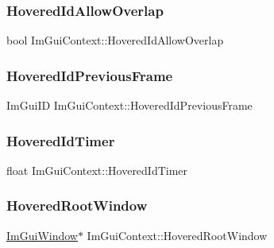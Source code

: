 \subsubsection{\texorpdfstring{Hovered\+Id\+Allow\+Overlap}{HoveredIdAllowOverlap}}
{\footnotesize\ttfamily bool Im\+Gui\+Context\+::\+Hovered\+Id\+Allow\+Overlap}

\hypertarget{struct_im_gui_context_a08742c14087e26304ff47fb9212d8eb6}{}\label{struct_im_gui_context_a08742c14087e26304ff47fb9212d8eb6} 
\subsubsection{\texorpdfstring{Hovered\+Id\+Previous\+Frame}{HoveredIdPreviousFrame}}
{\footnotesize\ttfamily Im\+Gui\+ID Im\+Gui\+Context\+::\+Hovered\+Id\+Previous\+Frame}

\hypertarget{struct_im_gui_context_a07a6bd929503077394ea0f80965470f9}{}\label{struct_im_gui_context_a07a6bd929503077394ea0f80965470f9} 
\subsubsection{\texorpdfstring{Hovered\+Id\+Timer}{HoveredIdTimer}}
{\footnotesize\ttfamily float Im\+Gui\+Context\+::\+Hovered\+Id\+Timer}

\hypertarget{struct_im_gui_context_ae5dcb8bed41ff948af2cfba6c9ae36d9}{}\label{struct_im_gui_context_ae5dcb8bed41ff948af2cfba6c9ae36d9} 
\subsubsection{\texorpdfstring{Hovered\+Root\+Window}{HoveredRootWindow}}
{\footnotesize\ttfamily \hyperlink{struct_im_gui_window}{Im\+Gui\+Window}$\ast$ Im\+Gui\+Context\+::\+Hovered\+Root\+Window}

\hypertarget{struct_im_gui_context_a6dd89693704216a036d2676b8c6610f8}{}\label{struct_im_gui_context_a6dd89693704216a036d2676b8c6610f8} 

